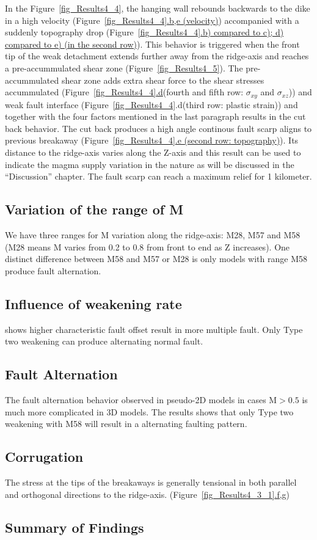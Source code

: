 In the Figure~\hyperref[fig_Results4_4]{\ref{fig_Results4_4}}, the hanging wall rebounds backwards to the dike in a high velocity (Figure~\hyperref[fig_Results4_4]{\ref{fig_Results4_4}.b,e (velocity)}) accompanied with a suddenly topography drop (Figure~\hyperref[fig_Results4_4]{\ref{fig_Results4_4}.b) compared to c); d) compared to e) (in the second row)}). This behavior is triggered when the front tip of the weak detachment extends further away from the ridge-axis and reaches a pre-accummulated shear zone (Figure~\hyperref[fig_Results4_5]{\ref{fig_Results4_5}}). The pre-accummulated shear zone adds extra shear force to the shear stresses accummulated (Figure~\hyperref[fig_Results4_4]{\ref{fig_Results4_4}.d}(fourth and fifth row: $\sigma_{xy}$ and $\sigma_{xz}$)) and weak fault interface (Figure~\hyperref[fig_Results4_4]{\ref{fig_Results4_4}}.d(third row: plastic strain)) and together with the four factors mentioned in the last paragraph results in the cut back behavior. The cut back produces a high angle continous fault scarp aligns to previous breakaway (Figure~\hyperref[fig_Results4_4]{\ref{fig_Results4_4}.e (second row: topography)}). Its distance to the ridge-axis varies along the Z-axis and this result can be used to indicate the magma supply variation in the nature as will be discussed in the ``Discussion'' chapter. The fault scarp can reach a maximum relief for 1 kilometer. 

\subsection{Variation of the range of M}
We have three ranges for M variation along the ridge-axis: M28, M57 and M58 (M28 means M varies from 0.2 to 0.8 from front to end as Z increases). One distinct difference between M58 and M57 or M28 is only models with range M58 produce fault alternation.

\subsection{Influence of weakening rate}
\citep{Lavier2000} shows higher characteristic fault offset result in more multiple fault. Only Type two weakening can produce alternating normal fault.
\subsection{Fault Alternation}
The fault alternation behavior observed in pseudo-2D models in cases M$>0.5$ is much more complicated in 3D models. The results shows that only Type two weakening with M58 will result in a alternating faulting pattern. 
\subsection{Corrugation}
The stress at the tips of the breakaways is generally tensional in both parallel and orthogonal directions to the ridge-axis. (Figure~\hyperref[fig_Results4_3_1]{\ref{fig_Results4_3_1}.f,g})
\subsection{Summary of Findings}

